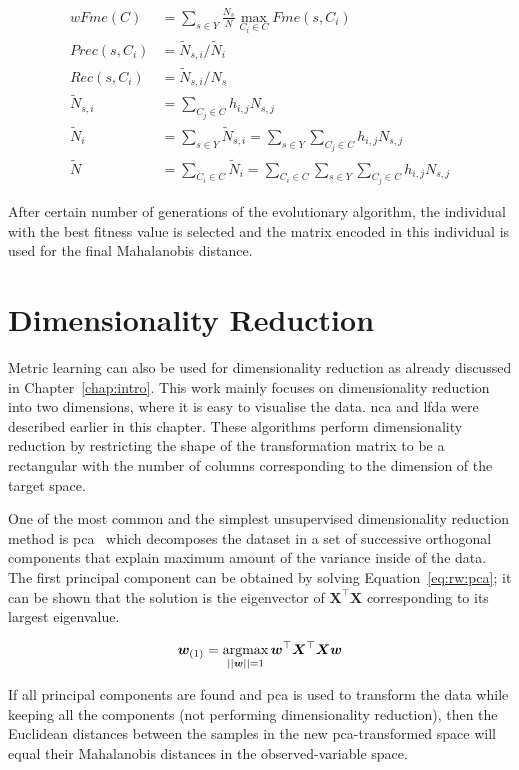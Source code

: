 \documentclass[12pt,a4paper]{report}
\begin{document}
\begin{align}
wFme(C) &= \sum_{s \in Y} \frac{N_s}{N} \max_{C_i \in C} Fme(s,C_i) \label{eq:rw:wfme} \\
Prec(s,C_i) &= \widetilde{N}_{s,i}/\widetilde{N}_i \\
Rec(s,C_i) &= \widetilde{N}_{s,i}/N_s \\
\widetilde{N}_{s,i} &= \sum_{C_j \in C} h_{i,j}N_{s,j} \\
\widetilde{N}_i &= \sum_{s\in Y}\widetilde{N}_{s,i}=\sum_{s\in Y}\sum_{C_j \in C} h_{i,j}N_{s,j} \\
\widetilde{N} &= \sum_{C_i \in C}\widetilde{N}_i = \sum_{C_i \in C}\sum_{s\in Y}\sum_{C_j \in C} h_{i,j}N_{s,j} \label{eq:rw:wfme:last}
\end{align}

After certain number of generations of the evolutionary algorithm, the individual with the best fitness value is selected and the matrix encoded in this individual is used for the final Mahalanobis distance.

\section{Dimensionality Reduction}

Metric learning can also be used for dimensionality reduction as already discussed in Chapter~\ref{chap:intro}. This work mainly focuses on dimensionality reduction into two dimensions, where it is easy to visualise the data. \Ac{nca} and \ac{lfda} were described earlier in this chapter. These algorithms perform dimensionality reduction by restricting the shape of the transformation matrix to be a rectangular with the number of columns corresponding to the dimension of the target space.

One of the most common and the simplest unsupervised dimensionality reduction method is \ac{pca}~\citep{jolliffe2002principal} which decomposes the dataset in a set of successive orthogonal components that explain maximum amount of the variance inside of the data. The first principal component can be obtained by solving Equation~\ref{eq:rw:pca}; it can be shown that the solution is the eigenvector of $\bm{X}^\top\bm{X}$ corresponding to its largest eigenvalue.

\begin{equation} 
\bm{w}_{(1)} = \operatorname*{argmax}_{||\bm{w}||=1} \bm{w}^\top\bm{X}^\top\bm{X}\bm{w} \label{eq:rw:pca}
\end{equation}

If all principal components are found and \ac{pca} is used to transform the data while keeping all the components (not performing dimensionality reduction), then the Euclidean distances between the samples in the new \ac{pca}-transformed space will equal their Mahalanobis distances in the observed-variable space.
\end{document}
